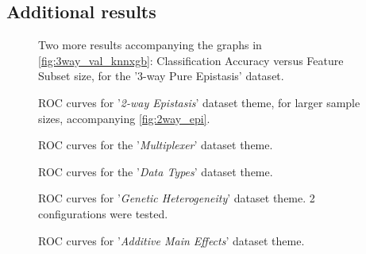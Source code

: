 \documentclass{article}
\begin{document}
\begin{appendices}
\section{Additional results}\label{sec:appendix-a}

\begin{figure}[ht]
\centering

\caption{Two more results accompanying the graphs in \autoref{fig:3way_val_knnxgb}: Classification Accuracy versus Feature Subset size, for the '3-way  Pure  Epistasis' dataset.}
\label{fig:3way_val_svmgnb}
\end{figure}

\begin{figure}[ht]
\centering


\caption{ROC curves for '\textit{2-way Epistasis}' dataset theme, for larger sample sizes, accompanying \autoref{fig:2way_epi}.}
\label{fig:2way_epi_large_samplesizes}
\end{figure}

\begin{figure}[ht]
\centering

\caption{ROC curves for the '\textit{Multiplexer}' dataset theme.}
\label{fig:multiplexer_benchmarks}
\end{figure}

\begin{figure}[ht]
\centering

\caption{ROC curves for the '\textit{Data Types}' dataset theme.}
\label{fig:data_types}
\end{figure}

\begin{figure}[ht]
\centering

\caption{ROC curves for '\textit{Genetic Heterogeneity}' dataset theme. 2 configurations were tested.}
\label{fig:genetic_heterogeneity}
\end{figure}

\begin{figure}[ht]
\centering

\caption{ROC curves for '\textit{Additive Main Effects}' dataset theme.}
\label{fig:additive_main_effects}
\end{figure}

\end{appendices}
\end{document}
